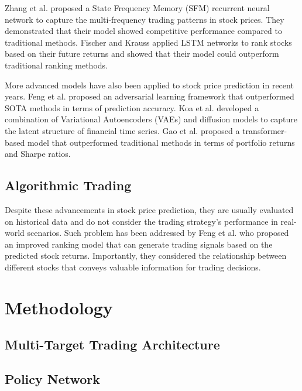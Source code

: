 \documentclass[conference]{IEEEtran}
\begin{document}
Zhang et al. \cite{zhang2017} proposed a State Frequency Memory (SFM)
recurrent neural network to capture the multi-frequency trading
patterns in stock prices. They demonstrated that their model showed
competitive performance compared to traditional methods. Fischer and
Krauss \cite{fischer2018} applied LSTM networks to rank stocks based
on their future returns and showed that their model could outperform
traditional ranking methods.

More advanced models have also been applied to stock price prediction
in recent years. Feng et al. \cite{feng2019an} proposed an
adversarial learning framework that outperformed SOTA methods in
terms of prediction accuracy. Koa et al. \cite{koa2023} developed a
combination of Variational Autoencoders (VAEs) and diffusion models
to capture the latent structure of financial time series. Gao et al.
\cite{gao2023} proposed a transformer-based model that outperformed
traditional methods in terms of portfolio returns and Sharpe ratios.

\subsection{Algorithmic Trading}

Despite these advancements in stock price prediction, they are
usually evaluated on historical data and do not consider the trading
strategy's performance in real-world scenarios. Such problem has been
addressed by Feng et al. \cite{feng2019rank} who proposed an improved
ranking model that can generate trading signals based on the
predicted stock returns. Importantly, they considered the
relationship between different stocks that conveys valuable
information for trading decisions.


\section{Methodology}

\subsection{Multi-Target Trading Architecture}


\subsection{Policy Network}
\end{document}
